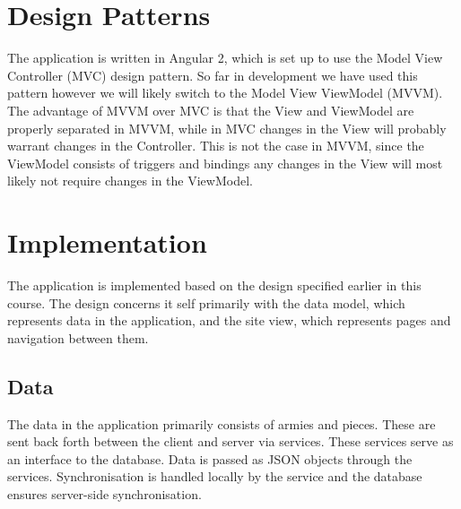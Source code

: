 \documentclass[10pt,a4paper]{report}
\begin{document}
\section{Design Patterns}
The application is written in Angular 2, which is set up to use the Model View Controller (MVC) design pattern. So far in development we have used this pattern however we will likely switch to the Model View ViewModel (MVVM). The advantage of MVVM over MVC is that the View and ViewModel are properly separated in MVVM, while in MVC changes in the View will probably warrant changes in the Controller. This is not the case in MVVM, since the ViewModel consists of triggers and bindings any changes in the View will most likely not require changes in the ViewModel.

\section{Implementation}
The application is implemented based on the design specified earlier in this course. The design concerns it self primarily with the data model, which represents data in the application, and the site view, which represents pages and navigation between them.

\subsection{Data}
\begin{minipage}{.35\textwidth}
The data in the application primarily consists of armies and pieces. These are sent back forth between the client and server via services. These services serve as an interface to the database. Data is passed as JSON objects through the services. Synchronisation is handled locally by the service and the database ensures server-side synchronisation.
\end{minipage}
\hfill
\begin{minipage}{.55\textwidth}

\end{minipage}
\end{document}
